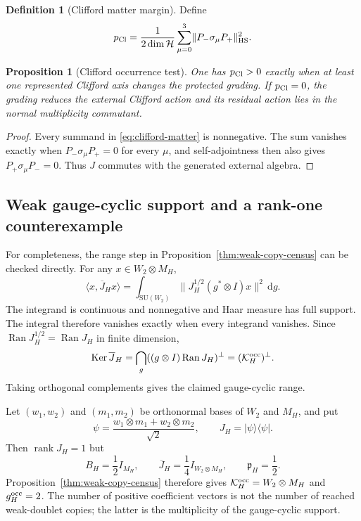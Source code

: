 \documentclass[11pt]{article}
\numberwithin{equation}{section}
\newtheorem{proposition}[theorem]{Proposition}
\theoremstyle{definition}
\newtheorem{definition}[theorem]{Definition}
\theoremstyle{remark}
\newcommand{\dd}{\mathrm d}
\newcommand{\rank}{\operatorname{rank}}
\newcommand{\Ker}{\operatorname{Ker}}
\newcommand{\Ran}{\operatorname{Ran}}
\newcommand{\SU}{\mathrm{SU}}
\newcommand{\HS}{\mathrm{HS}}
\newcommand{\norm}[1]{\lVert#1\rVert}
\newcommand{\Hh}{\mathcal H}
\begin{document}
\begin{definition}[Clifford matter margin]
\label{def:clifford-matter}
Define
\begin{equation}
p_{\rm Cl}
=
\frac{1}{2\dim\Hh}
\sum_{\mu=0}^{3}
\norm{P_-\sigma_\mu P_+}_{\HS}^2.
\label{eq:clifford-matter}
\end{equation}
\end{definition}

\begin{proposition}[Clifford occurrence test]
\label{prop:clifford-occurrence}
One has $p_{\rm Cl}>0$ exactly when at least one represented Clifford axis
changes the protected grading.  If $p_{\rm Cl}=0$, the grading reduces the
external Clifford action and its residual action lies in the normal
multiplicity commutant.
\end{proposition}

\begin{proof}
Every summand in \eqref{eq:clifford-matter} is nonnegative.  The sum vanishes
exactly when $P_-\sigma_\mu P_+=0$ for every $\mu$, and self-adjointness then
also gives $P_+\sigma_\mu P_-=0$.  Thus $J$ commutes with the generated
external algebra.
\end{proof}


\subsection{Weak gauge-cyclic support and a rank-one counterexample}
\label{app:weak-cyclic-example}

For completeness, the range step in
Proposition~\ref{thm:weak-copy-census} can be checked directly.  For any
$x\in W_2\otimes M_H$,
\[
 \langle x,\overline J_Hx\rangle
 =\int_{\SU(W_2)}\|J_H^{1/2}(g^*\otimes I)x\|^2\,\dd g.
\]
The integrand is continuous and nonnegative and Haar measure has full
support.  The integral therefore vanishes exactly when every integrand
vanishes.  Since $\Ran J_H^{1/2}=\Ran J_H$ in finite dimension,
\[
 \Ker\overline J_H
 =\bigcap_g((g\otimes I)\Ran J_H)^\perp
 =(\mathcal K_H^{\rm occ})^\perp.
\]
Taking orthogonal complements gives the claimed gauge-cyclic range.

Let $(w_1,w_2)$ and $(m_1,m_2)$ be orthonormal bases of $W_2$ and $M_H$,
and put
\[
 \psi=\frac{w_1\otimes m_1+w_2\otimes m_2}{\sqrt2},\qquad
 J_H=|\psi\rangle\langle\psi|.
\]
Then $\rank J_H=1$ but
\[
 B_H=\frac12I_{M_H},\qquad
 \overline J_H=\frac14 I_{W_2\otimes M_H},\qquad
 \mathfrak p_H=\frac12.
\]
Proposition~\ref{thm:weak-copy-census} therefore gives
$\mathcal K_H^{\rm occ}=W_2\otimes M_H$ and $g_H^{\rm occ}=2$.
The number of positive coefficient vectors is not the number of reached
weak-doublet copies; the latter is the multiplicity of the gauge-cyclic
support.
\end{document}
